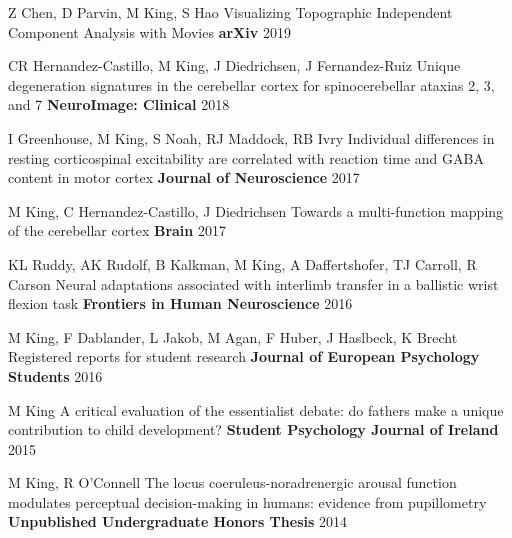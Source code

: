 \begin{cventries}
  \cventry
    {Z Chen, D Parvin, M King, S Hao} %
    {Visualizing Topographic Independent Component Analysis with Movies} %
    {\textbf{arXiv}} %
    {2019} %
    {}
    
  \cventry
    {CR Hernandez-Castillo, M King, J Diedrichsen, J Fernandez-Ruiz} %
    {Unique degeneration signatures in the cerebellar cortex for spinocerebellar ataxias 2, 3, and 7} %
    {\textbf{NeuroImage: Clinical}} %
    {2018} %
    {}
    
  \cventry
    {I Greenhouse, M King, S Noah, RJ Maddock, RB Ivry} %
    {Individual differences in resting corticospinal excitability are correlated with reaction time and GABA content in motor cortex} %
    {\textbf{Journal of Neuroscience}} %
    {2017} %
    {}
    
  \cventry
    {M King, C Hernandez-Castillo, J Diedrichsen} %
    {Towards a multi-function mapping of the cerebellar cortex} %
    {\textbf{Brain}} %
    {2017} %
    {}
    
  \cventry
    {KL Ruddy, AK Rudolf, B Kalkman, M King, A Daffertshofer, TJ Carroll, R Carson} %
    {Neural adaptations associated with interlimb transfer in a ballistic wrist flexion task} %
    {\textbf{Frontiers in Human Neuroscience}} %
    {2016} %
    {}
    
  \cventry
    {M King, F Dablander, L Jakob, M Agan, F Huber, J Haslbeck, K Brecht} %
    {Registered reports for student research} %
    {\textbf{Journal of European Psychology Students}} %
    {2016} %
    {}
    
  \cventry
    {M King} %
    {A critical evaluation of the essentialist debate: do fathers make a unique contribution to child development?} %
    {\textbf{Student Psychology Journal of Ireland}} %
    {2015} %
    {}
    
  \cventry
    {M King, R O'Connell} %
    {The locus coeruleus-noradrenergic arousal function modulates perceptual decision-making in humans: evidence from pupillometry} %
    {\textbf{Unpublished Undergraduate Honors Thesis}} %
    {2014} %
    {}

\end{cventries}